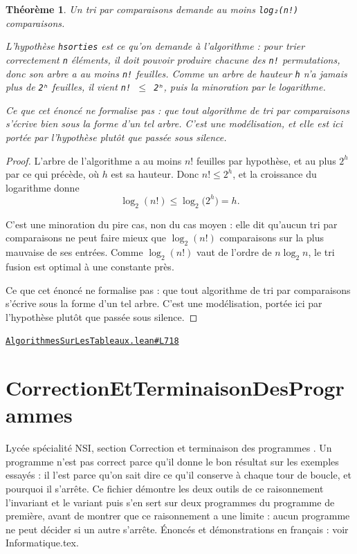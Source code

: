 \documentclass[11pt,a4paper]{article}
\theoremstyle{definition}
\theoremstyle{plain}
\newtheorem{theoreme}{Théorème}
\newcommand{\source}[2]{\par\smallskip\noindent\hfill{\footnotesize\href{#1}{\texttt{#2}}}\par\smallskip}
\begin{document}
\begin{theoreme}
Un tri par comparaisons demande au moins \texttt{log₂(n!)} comparaisons.

L'hypothèse \texttt{hsorties} est ce qu'on demande à l'algorithme : pour trier
correctement \texttt{n} éléments, il doit pouvoir produire chacune des \texttt{n!} permutations,
donc son arbre a au moins \texttt{n!} feuilles. Comme un arbre de hauteur \texttt{h} n'a jamais
plus de \texttt{2ʰ} feuilles, il vient \texttt{n! \(\le\) 2ʰ}, puis la minoration par le logarithme.

Ce que cet énoncé ne formalise pas : que tout algorithme de tri par comparaisons
s'écrive bien sous la forme d'un tel arbre. C'est une modélisation, et elle est ici
portée par l'hypothèse plutôt que passée sous silence.
\end{theoreme}
\begin{proof}
L'arbre de l'algorithme a au moins \(n!\) feuilles par hypothèse, et au plus \(2^h\) par
ce qui précède, où \(h\) est sa hauteur. Donc \(n! \le 2^h\), et la croissance du
logarithme donne
\[ \log_2(n!) \le \log_2\bigl(2^h\bigr) = h . \]

C'est une minoration du pire cas, non du cas moyen : elle dit qu'aucun tri par
comparaisons ne peut faire mieux que \(\log_2(n!)\) comparaisons sur la plus mauvaise de
ses entrées. Comme \(\log_2(n!)\) vaut de l'ordre de \(n \log_2 n\), le tri fusion est
optimal à une constante près.

Ce que cet énoncé ne formalise pas : que tout algorithme de tri par comparaisons
s'écrive sous la forme d'un tel arbre. C'est une modélisation, portée ici par
l'hypothèse plutôt que passée sous silence.
\end{proof}
\source{https://github.com/Commutator-IO/learn-lean/blob/main/courses/02-lycee/11-informatique-nsi/AlgorithmesSurLesTableaux.lean\#L718}{AlgorithmesSurLesTableaux.lean\#L718}

\section{CorrectionEtTerminaisonDesProgrammes}

\noindent
Lycée \textemdash{} spécialité NSI, section \og{} Correction et terminaison des programmes \fg{}.
Un programme n'est pas correct parce qu'il donne le bon résultat sur les exemples
essayés : il l'est parce qu'on sait dire ce qu'il conserve à chaque tour de boucle,
et pourquoi il s'arrête. Ce fichier démontre les deux outils de ce raisonnement \textemdash{}
l'invariant et le variant \textemdash{} puis s'en sert sur deux programmes du programme de
première, avant de montrer que ce raisonnement a une limite : aucun programme ne
peut décider si un autre s'arrête.
Énoncés et démonstrations en français : voir Informatique.tex.
\end{document}
